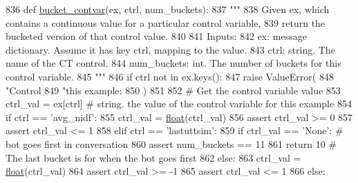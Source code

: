 \begin{DoxyCode}
836 \textcolor{keyword}{def }\hyperlink{namespaceprojects_1_1controllable__dialogue_1_1controllable__seq2seq_1_1controls_a60657d8955080feedb6dcbb084e2ae13}{bucket\_contvar}(ex, ctrl, num\_buckets):
837     \textcolor{stringliteral}{"""}
838 \textcolor{stringliteral}{    Given ex, which contains a continuous value for a particular control variable,}
839 \textcolor{stringliteral}{    return the bucketed version of that control value.}
840 \textcolor{stringliteral}{}
841 \textcolor{stringliteral}{    Inputs:}
842 \textcolor{stringliteral}{      ex: message dictionary. Assume it has key ctrl, mapping to the value.}
843 \textcolor{stringliteral}{      ctrl: string. The name of the CT control.}
844 \textcolor{stringliteral}{      num\_buckets: int. The number of buckets for this control variable.}
845 \textcolor{stringliteral}{    """}
846     \textcolor{keywordflow}{if} ctrl \textcolor{keywordflow}{not} \textcolor{keywordflow}{in} ex.keys():
847         \textcolor{keywordflow}{raise} ValueError(
848             \textcolor{stringliteral}{"Control %
849             \textcolor{stringliteral}{"this example: %
850         )
851 
852     \textcolor{comment}{# Get the control variable value}
853     ctrl\_val = ex[ctrl]  \textcolor{comment}{# string. the value of the control variable for this example}
854     \textcolor{keywordflow}{if} ctrl == \textcolor{stringliteral}{'avg\_nidf'}:
855         ctrl\_val = \hyperlink{namespaceprojects_1_1controllable__dialogue_1_1make__control__dataset_aa2b7207688c641dbc094ab44eca27113}{float}(ctrl\_val)
856         \textcolor{keyword}{assert} ctrl\_val >= 0
857         \textcolor{keyword}{assert} ctrl\_val <= 1
858     \textcolor{keywordflow}{elif} ctrl == \textcolor{stringliteral}{'lastuttsim'}:
859         \textcolor{keywordflow}{if} ctrl\_val == \textcolor{stringliteral}{'None'}:  \textcolor{comment}{# bot goes first in conversation}
860             \textcolor{keyword}{assert} num\_buckets == 11
861             \textcolor{keywordflow}{return} 10  \textcolor{comment}{# The last bucket is for when the bot goes first}
862         \textcolor{keywordflow}{else}:
863             ctrl\_val = \hyperlink{namespaceprojects_1_1controllable__dialogue_1_1make__control__dataset_aa2b7207688c641dbc094ab44eca27113}{float}(ctrl\_val)
864             \textcolor{keyword}{assert} ctrl\_val >= -1
865             \textcolor{keyword}{assert} ctrl\_val <= 1
866     \textcolor{keywordflow}{else}:
}}
\end{DoxyCode}
